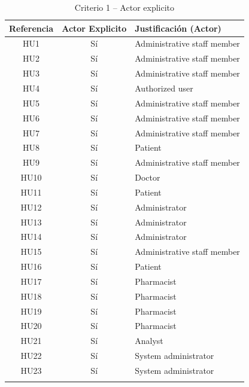 \begin{longtable}{|c|c|p{6cm}|}
\hline
\textbf{Referencia} & \textbf{Actor Explicito} & \textbf{Justificación (Actor)} \\
\hline
HU1  & Sí & Administrative staff member \\
\hline
HU2  & Sí & Administrative staff member \\
\hline
HU3  & Sí & Administrative staff member \\
\hline
HU4  & Sí & Authorized user \\
\hline
HU5  & Sí & Administrative staff member \\
\hline
HU6  & Sí & Administrative staff member \\
\hline
HU7  & Sí & Administrative staff member \\
\hline
HU8  & Sí & Patient \\
\hline
HU9  & Sí & Administrative staff member \\
\hline
HU10 & Sí & Doctor \\
\hline
HU11 & Sí & Patient \\
\hline
HU12 & Sí & Administrator \\
\hline
HU13 & Sí & Administrator \\
\hline
HU14 & Sí & Administrator \\
\hline
HU15 & Sí & Administrative staff member \\
\hline
HU16 & Sí & Patient \\
\hline
HU17 & Sí & Pharmacist \\
\hline
HU18 & Sí & Pharmacist \\
\hline
HU19 & Sí & Pharmacist \\
\hline
HU20 & Sí & Pharmacist \\
\hline
HU21 & Sí & Analyst \\
\hline
HU22 & Sí & System administrator \\
\hline
HU23 & Sí & System administrator \\
\hline
\caption{Criterio 1 – Actor explicito}
\end{longtable}

